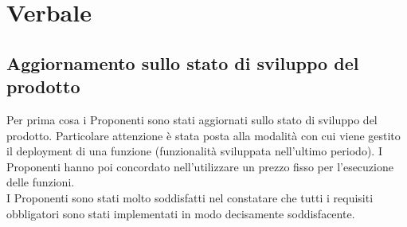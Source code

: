 \section{Verbale}
\subsection{Aggiornamento sullo stato di sviluppo del prodotto}
Per prima cosa i Proponenti sono stati aggiornati sullo stato di sviluppo del prodotto. Particolare attenzione è stata posta alla modalità con cui viene gestito il deployment di una funzione (funzionalità sviluppata nell'ultimo periodo). I Proponenti hanno poi concordato nell'utilizzare un prezzo fisso per l'esecuzione delle funzioni.
\\
I Proponenti sono stati molto soddisfatti nel constatare che tutti i requisiti obbligatori sono stati implementati in modo decisamente soddisfacente.

